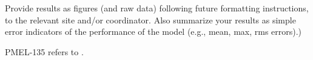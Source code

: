 \documentclass[11pt]{article}
\begin{document}
Provide results as figures (and raw data) following future formatting
instructions, to the relevant site and/or coordinator. Also summarize your
results as simple error indicators of the performance of the model (e.g.,
mean, max, rms errors).)

PMEL-135 refers to \cite{SynolakisBernard:pmel135}.
















\end{document}
